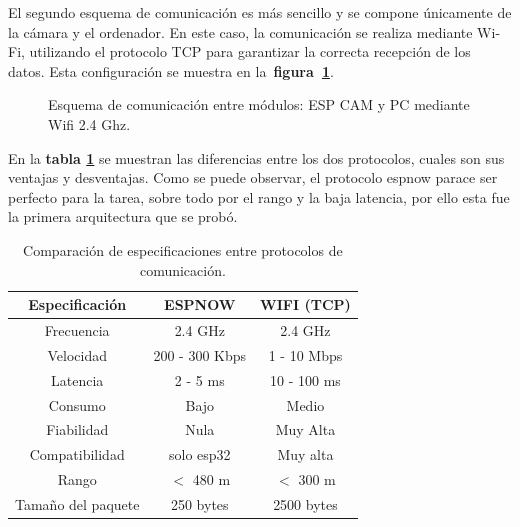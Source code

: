 El segundo esquema de comunicación es más sencillo y se compone únicamente de la cámara y el ordenador. En este caso, la comunicación se realiza mediante Wi-Fi, utilizando el protocolo TCP para garantizar la correcta recepción de los datos. Esta configuración se muestra en la~\textbf{figura~\ref{fig:comms_esquema_wifi}}.

\vspace{1cm}
\begin{figure}[H] %
    \centering
    \caption{Esquema de comunicación entre módulos: ESP CAM y PC mediante Wifi 2.4 Ghz.}
    \label{fig:comms_esquema_wifi}
\end{figure}

En la \textbf{tabla \ref{tab:comp_now_wifi}} se muestran las diferencias entre los dos protocolos, cuales son sus ventajas y desventajas. Como se puede observar, el protocolo espnow parace ser perfecto para la tarea, sobre todo por el rango y la baja latencia, por ello esta fue la primera arquitectura que se probó.

\begin{table}[H]
    \centering
    \begin{tabular}{|c|c|c|}
        \hline
        \textbf{Especificación} & \textbf{ESPNOW} & \textbf{WIFI (TCP)} \\
        \hline
        Frecuencia      & 2.4 GHz & 2.4 GHz \\
        Velocidad       & 200 - 300 Kbps & 1 - 10 Mbps \\
        Latencia        & 2 - 5 ms & 10 - 100 ms\\
        Consumo         & Bajo & Medio \\
        Fiabilidad      & Nula & Muy Alta\\
        Compatibilidad  & solo esp32 & Muy alta\\
        Rango           & $<$ 480 m & $<$ 300 m\\
        Tamaño del paquete & 250 bytes & 2500 bytes \\
        \hline
    \end{tabular}
    \caption{Comparación de especificaciones entre protocolos de comunicación.}
    \label{tab:comp_now_wifi}
\end{table}
